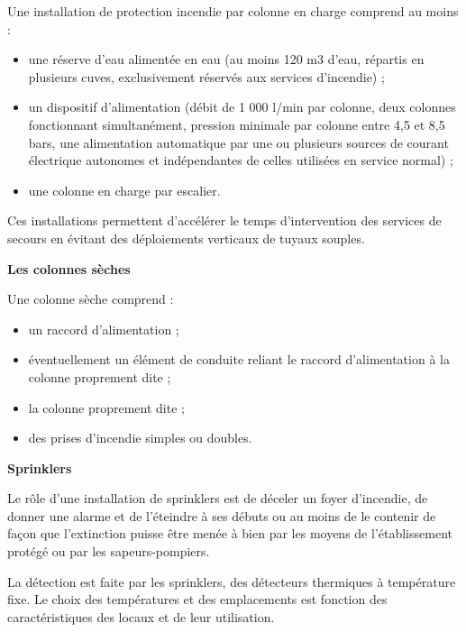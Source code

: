 Une installation de protection incendie par colonne en charge comprend au moins :

\begin{itemize}
\item  une réserve d’eau alimentée en eau (au moins 120 m3 d’eau, répartis en plusieurs cuves, exclusivement réservés aux services d’incendie) ;
\item  un dispositif d’alimentation (débit de 1 000 l/min par colonne, deux colonnes fonctionnant simultanément, pression minimale par colonne entre 4,5 et 8,5 bars, une alimentation automatique par une ou plusieurs sources de courant électrique autonomes et indépendantes de celles utilisées en service normal) ;
\item  une colonne en charge par escalier.

\end{itemize}

Ces installations permettent d’accélérer le temps d’intervention des services de secours en évitant des déploiements verticaux de tuyaux souples.

\vspace{0.3cm}
\textbf{Les colonnes sèches}
\vspace{0.3cm}

Une colonne sèche comprend :

\begin{itemize}

\item  un raccord d’alimentation ;
\item  éventuellement un élément de conduite reliant le raccord d’alimentation à la colonne proprement dite ;
\item  la colonne proprement dite ;
\item  des prises d’incendie simples ou doubles.

\end{itemize}

\vspace{ 0.3cm}
\textbf{Sprinklers}
\vspace{0.3cm}

Le rôle d’une installation de sprinklers est de déceler un foyer d’incendie, de donner une alarme et de l’éteindre à ses débuts ou au moins de le contenir de façon que l’extinction puisse être menée à bien par les moyens de l’établissement protégé ou par les sapeurs-pompiers.
\vspace{0.3cm}

La détection est faite par les sprinklers, des détecteurs thermiques à température fixe. Le choix des températures et des emplacements est fonction des caractéristiques des locaux et de leur utilisation.
\vspace{0.3cm}

